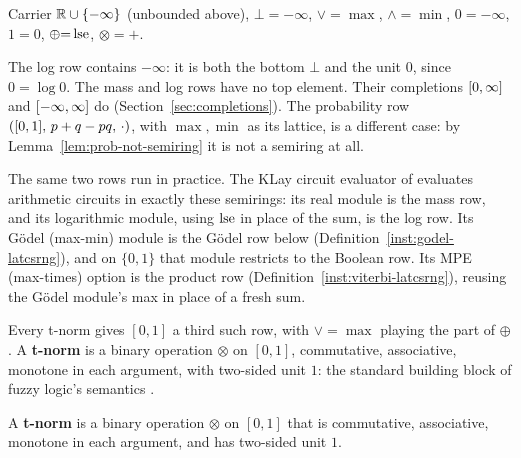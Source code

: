 \begin{instance}
\label{inst:logS-latcsrng}
\leanok
Carrier $\mathbb R \cup \{-\infty\}$ (unbounded above), $\bot{=}{-\infty}$, $\vee{=}\max$,
$\wedge{=}\min$, $0{=}{-\infty}$, $1{=}0$, $\oplus{=}\operatorname{lse}$,
$\otimes{=}{+}$.
\end{instance}

The log row contains $-\infty$: it is both the bottom $\bot$ and the
unit $0$, since $0 = \log 0$. The mass and log rows have no top
element. Their completions $[0,\infty]$ and $[-\infty,\infty]$ do
(Section~\ref{sec:completions}). The probability row
$([0,1],\, p+q-pq,\, \cdot)$, with $\max,\min$ as its lattice, is a
different case: by Lemma~\ref{lem:prob-not-semiring} it is not a
semiring at all.

The same two rows run in practice. The KLay circuit evaluator of
\citet{maeneKLay2025} evaluates arithmetic circuits in exactly these
semirings: its real module is the mass row, and its logarithmic
module, using $\operatorname{lse}$ in place of the sum, is the log row.
Its Gödel (max-min) module is the Gödel row below
(Definition~\ref{inst:godel-latcsrng}), and on $\{0,1\}$ that module
restricts to the Boolean row. Its MPE (max-times) option is the
product row (Definition~\ref{inst:viterbi-latcsrng}), reusing the Gödel
module's max in place of a fresh sum.

Every t-norm gives $[0,1]$ a third such row, with $\vee=\max$ playing
the part of $\oplus$. A \textbf{t-norm} is a binary operation $\otimes$
on $[0,1]$, commutative, associative, monotone in each argument, with
two-sided unit $1$: the standard building block of fuzzy logic's
semantics \citep{hajekMetamathematicsFuzzyLogic1998}.

\begin{definition}[T-norm]
\label{def:tnorm}
\leanok
A \textbf{t-norm} is a binary operation $\otimes$ on $[0,1]$ that is
commutative, associative, monotone in each argument, and has two-sided
unit $1$.
\end{definition}

